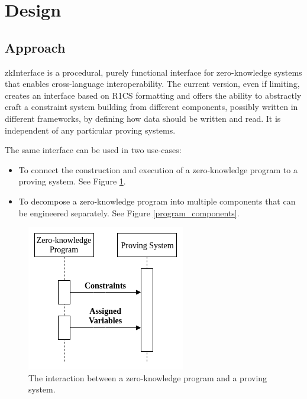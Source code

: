 \section{Design}

\subsection{Approach}

	zkInterface is a procedural, purely functional interface for zero-knowledge systems that enables cross-language interoperability. The current version, even if limiting, creates an interface based on R1CS formatting and offers the ability to abstractly craft a constraint system building from different components, possibly written in different frameworks, by defining how data should be written and read. 
	It is independent of any particular proving systems.

	The same interface can be used in two use-cases:
	\begin{itemize}
		\item To connect the construction and execution of a zero-knowledge program
			to a proving system. See Figure \ref{program_proving}.

		\item To decompose a zero-knowledge program into multiple components that can be engineered separately. See Figure \ref{program_components}.
	\end{itemize}
	
\begin{figure}[!h]
	\centering
	\includegraphics[width=0.5\linewidth]{graphics/program_proving.png}
	\caption{The interaction between a zero-knowledge program and a proving system.}
	\label{program_proving}
\end{figure}

